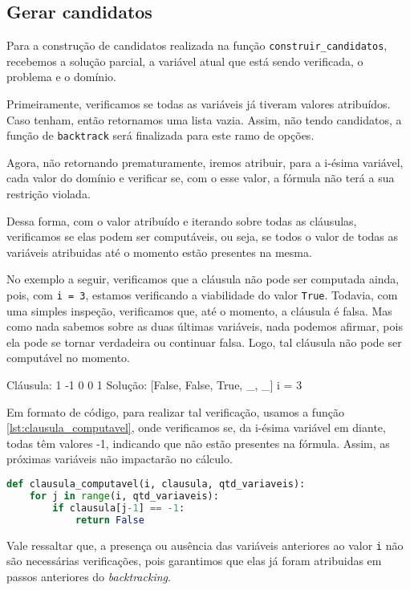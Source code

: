 \documentclass[12pt]{article}
\begin{document}
    \subsection{Gerar candidatos}
    \par Para a construção de candidatos realizada na função \verb|construir_candidatos|, recebemos a solução parcial, a variável atual que está sendo verificada, o problema e o domínio.
    \par Primeiramente, verificamos se todas as variáveis já tiveram valores atribuídos. Caso tenham, então retornamos uma lista vazia. Assim, não tendo candidatos, a função de \verb|backtrack| será finalizada para este ramo de opções.
    \par Agora, não retornando prematuramente, iremos atribuir, para a i-ésima variável, cada valor do domínio e verificar se, com o esse valor, a fórmula não terá a sua restrição violada.

    \par Dessa forma, com o valor atribuído e iterando sobre todas as cláusulas, verificamos se elas podem ser computáveis, ou seja, se todos o valor de todas as variáveis atribuidas até o momento estão presentes na mesma.
    \par No exemplo a seguir, verificamos que a cláusula não pode ser computada ainda, pois, com \verb|i = 3|, estamos verificando a viabilidade do valor \verb|True|. Todavia, com uma simples inspeção, verificamos que, até o momento, a cláusula é falsa. Mas como nada sabemos sobre as duas últimas variáveis, nada podemos afirmar, pois ela pode se tornar verdadeira ou continuar falsa. Logo, tal cláusula não pode ser computável no momento.
    \begin{tcolorbox}[width=\linewidth, fontupper=\ttfamily,  halign=flush left]
        Cláusula: 1 -1 0 0 1 \newline 
        Solução: [False, False, True, \_, \_] \newline
        i = 3
    \end{tcolorbox}

    \par Em formato de código, para realizar tal verificação, usamos a função \ref{lst:clausula_computavel}, onde verificamos se, da i-ésima variável em diante, todas têm valores -1, indicando que não estão presentes na fórmula. Assim, as próximas variáveis não impactarão no cálculo.


\begin{lstlisting}[caption={Verificando se cláusula é computável},label={lst:clausula_computavel}, language=Python]
def clausula_computavel(i, clausula, qtd_variaveis):  
    for j in range(i, qtd_variaveis):
        if clausula[j-1] == -1:
            return False
 \end{lstlisting}
    \par Vale ressaltar que, a presença ou ausência das variáveis anteriores ao valor \verb|i| não são necessárias verificações, pois garantimos que elas já foram atribuidas em passos anteriores do \textit{backtracking}.
\end{document}
